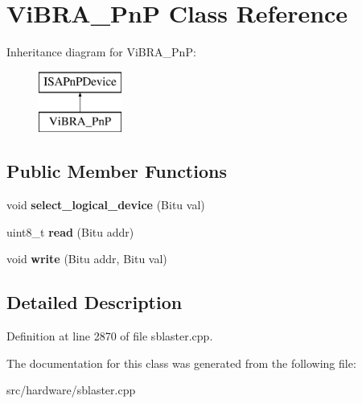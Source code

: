 \hypertarget{classViBRA__PnP}{\section{Vi\-B\-R\-A\-\_\-\-Pn\-P Class Reference}
\label{classViBRA__PnP}
}
Inheritance diagram for Vi\-B\-R\-A\-\_\-\-Pn\-P\-:\begin{figure}[H]
\begin{center}
\leavevmode
\includegraphics[height=2.000000cm]{classViBRA__PnP}
\end{center}
\end{figure}
\subsection*{Public Member Functions}
\begin{DoxyCompactItemize}
\item 
\hypertarget{classViBRA__PnP_ad5d0a168bbb86f72c44255c0b065ec1a}{void {\bfseries select\-\_\-logical\-\_\-device} (Bitu val)}\label{classViBRA__PnP_ad5d0a168bbb86f72c44255c0b065ec1a}

\item 
\hypertarget{classViBRA__PnP_ac467093f48f75b421715ebd10a676f05}{uint8\-\_\-t {\bfseries read} (Bitu addr)}\label{classViBRA__PnP_ac467093f48f75b421715ebd10a676f05}

\item 
\hypertarget{classViBRA__PnP_a9d6d3c3ad0a64c68a222f93ee3a30f31}{void {\bfseries write} (Bitu addr, Bitu val)}\label{classViBRA__PnP_a9d6d3c3ad0a64c68a222f93ee3a30f31}

\end{DoxyCompactItemize}


\subsection{Detailed Description}


Definition at line 2870 of file sblaster.\-cpp.



The documentation for this class was generated from the following file\-:\begin{DoxyCompactItemize}
\item 
src/hardware/sblaster.\-cpp\end{DoxyCompactItemize}
